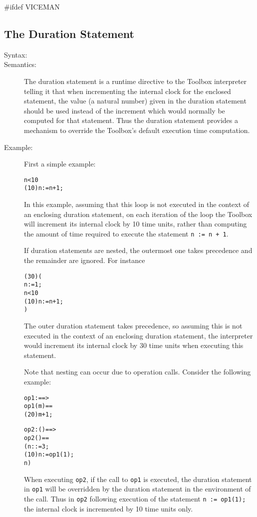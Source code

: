 \documentclass[\pformat,12pt]{article}
\begin{document}
#ifdef VICEMAN
\subsection{The Duration Statement}
\begin{description}
\item[Syntax:]

\item[Semantics:]
The duration statement is a runtime directive to the Toolbox
interpreter telling it that when incrementing the internal clock for the
enclosed statement, the value (a natural number)
given in the duration statement should
be used instead of the increment which would normally be computed for that
statement. Thus the duration statement provides a mechanism to
override the Toolbox's default execution time computation.

\item[Example:] First a simple example:
\begin{alltt}
       n < 10 
         (10) n := n + 1; 
\end{alltt}
In this example, assuming that this loop is not executed in the
context of an enclosing duration statement, on each iteration of the
loop the Toolbox will increment its internal clock by 10 time units,
rather than computing the amount of time required to execute the
statement \texttt{n := n + 1}. 

If duration statements are nested, the outermost one takes precedence
and the remainder are ignored. For instance
\begin{alltt}
      (30)(
        n := 1;
         n < 10 
           (10) n := n + 1; 
        )
\end{alltt}
The outer duration statement takes precedence, so assuming this is not
executed in the context of an enclosing duration statement, the
interpreter would increment its internal clock by 30 time units when
executing this statement.

Note that nesting can occur due to operation calls. Consider the
following example:
\begin{alltt}
      op1 :  ==> 
      op1(m) ==
        (20)  m + 1;

      op2 : () ==> 
      op2() ==
      ( n :  := 3;
       (10)  n := op1(1);
        n) 
\end{alltt}
When executing \texttt{op2}, if the call to \texttt{op1} is
executed, the duration statement in \texttt{op1} will be overridden by
the duration statement in the environment of the call. Thus in
\texttt{op2} following execution of the statement 
\texttt{n := op1(1);} the internal clock is incremented by 10 time units
only. 


\end{description}
\end{document}

